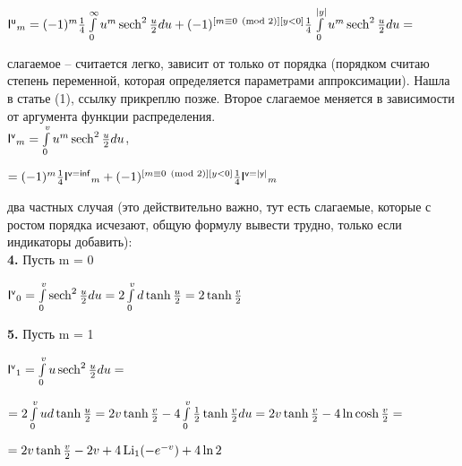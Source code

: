 \documentclass[a4paper,12pt]{article}
\begin{document}
\begin{center}
    $\mathsf{I^u}_m = (-1)^m{1\over{4}} \int\limits_0^{\infty} u^m \operatorname{sech}^2{u\over{2}} d u  + (-1)^{[m \equiv 0 \pmod{2}][y < 0]}{1\over{4}}  \int\limits_0^{|y|} u^m \operatorname{sech}^2{u\over{2}} d u = $
\end{center}

 слагаемое – считается легко, зависит от только от порядка (порядком считаю степень переменной, которая определяется параметрами аппроксимации). Нашла в статье (1), ссылку прикреплю позже. Второе слагаемое меняется в зависимости от аргумента функции распределения.\\

 $\mathsf{I^{v}}_m = \int\limits_0^{v} u^m \operatorname{sech}^2{u\over{2}} d u$, 

\begin{center}
    $= (-1)^m {1\over{4}} \mathsf{I^{v = inf}}_m  + (-1)^{[m \equiv 0 \pmod{2}][y < 0]} {1\over{4}} \mathsf{I^{v = |y|}}_m$
\end{center}

 два частных случая (это действительно важно, тут есть слагаемые, которые с ростом порядка исчезают, общую формулу вывести трудно, только если индикаторы добавить):\\

\noindent\textbf{4.} Пусть m = 0

\begin{center}
    $\mathsf{I^{v}}_0 = \int\limits_0^{v} \operatorname{sech}^2{u\over{2}} d u = 2\int\limits_{0}^v d\operatorname{tanh}{u\over{2}} = 2 \operatorname{tanh}{v\over{2}}$
\end{center}

\noindent\textbf{5.} Пусть m = 1

\begin{center}
    $\mathsf{I^{v}}_1 = \int\limits_0^{v} u \operatorname{sech}^2{u\over{2}} d u =$
\end{center}

\begin{center}
    $= 2\int\limits_{0}^v u d\operatorname{tanh}{u\over{2}} = 2v \operatorname{tanh}{v\over{2}} - 4\int\limits_0^v {1\over{2}} \operatorname{tanh}{v\over{2}}du = 2v\operatorname{tanh}{v\over{2}} - 4\ln{\operatorname{cosh}{v\over{2}}} =$
\end{center}

\begin{center}
    $= 2v\operatorname{tanh}{v\over{2}} - 2v + 4\operatorname{Li_1}(-e^{-v}) + 4\ln{2}$
\end{center}\\
\end{document}
